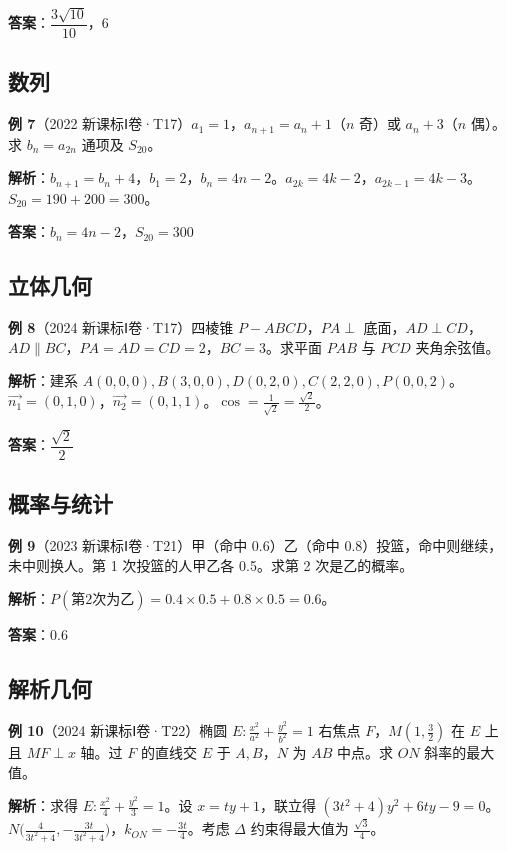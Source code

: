 \textbf{答案}：$\dfrac{3\sqrt{10}}{10}$，$6$

\subsection{数列}

\textbf{例 7}（2022 新课标Ⅰ卷·T17）$a_1=1$，$a_{n+1}=a_n+1$（$n$ 奇）或 $a_n+3$（$n$ 偶）。求 $b_n=a_{2n}$ 通项及 $S_{20}$。

\textbf{解析}：$b_{n+1}=b_n+4$，$b_1=2$，$b_n=4n-2$。$a_{2k}=4k-2$，$a_{2k-1}=4k-3$。$S_{20}=190+200=300$。

\textbf{答案}：$b_n=4n-2$，$S_{20}=300$

\subsection{立体几何}

\textbf{例 8}（2024 新课标Ⅰ卷·T17）四棱锥 $P-ABCD$，$PA\perp$ 底面，$AD\perp CD$，$AD\parallel BC$，$PA=AD=CD=2$，$BC=3$。求平面 $PAB$ 与 $PCD$ 夹角余弦值。

\textbf{解析}：建系 $A(0,0,0),B(3,0,0),D(0,2,0),C(2,2,0),P(0,0,2)$。$\vec{n_1}=(0,1,0)$，$\vec{n_2}=(0,1,1)$。$\cos=\frac{1}{\sqrt{2}}=\frac{\sqrt{2}}{2}$。

\textbf{答案}：$\dfrac{\sqrt{2}}{2}$

\subsection{概率与统计}

\textbf{例 9}（2023 新课标Ⅰ卷·T21）甲（命中 0.6）乙（命中 0.8）投篮，命中则继续，未中则换人。第 1 次投篮的人甲乙各 0.5。求第 2 次是乙的概率。

\textbf{解析}：$P(\text{第2次为乙}) = 0.4\times0.5 + 0.8\times0.5 = 0.6$。

\textbf{答案}：$0.6$

\subsection{解析几何}

\textbf{例 10}（2024 新课标Ⅰ卷·T22）椭圆 $E:\frac{x^2}{a^2}+\frac{y^2}{b^2}=1$ 右焦点 $F$，$M(1,\frac32)$ 在 $E$ 上且 $MF\perp x$ 轴。过 $F$ 的直线交 $E$ 于 $A,B$，$N$ 为 $AB$ 中点。求 $ON$ 斜率的最大值。

\textbf{解析}：求得 $E:\frac{x^2}{4}+\frac{y^2}{3}=1$。设 $x=ty+1$，联立得 $(3t^2+4)y^2+6ty-9=0$。$N\big(\frac{4}{3t^2+4},-\frac{3t}{3t^2+4}\big)$，$k_{ON}=-\frac{3t}{4}$。考虑 $\Delta$ 约束得最大值为 $\frac{\sqrt{3}}{4}$。


